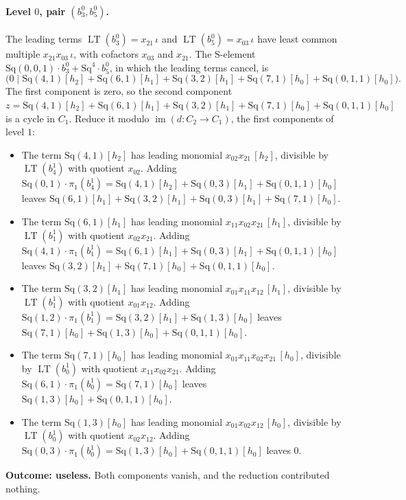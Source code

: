 \documentclass[11pt]{article}
\newcommand{\Sq}{\mathrm{Sq}}
\DeclareMathOperator{\LT}{LT}
\begin{document}
\paragraph{Level $0$, pair $(b^{0}_{3}, b^{0}_{5})$.} The leading terms $\LT(b^{0}_{3}) = x_{21}\,\iota$ and $\LT(b^{0}_{5}) = x_{03}\,\iota$ have least common multiple $x_{21}x_{03}\,\iota$, with cofactors $x_{03}$ and $x_{21}$. The S-element $\Sq(0,0,1)\cdot b^{0}_{3} + \Sq^{4}\cdot b^{0}_{5}$, in which the leading terms cancel, is
\[\bigl(0 \;\big|\; \Sq(4,1)[h_2] + \Sq(6,1)[h_1] + \Sq(3,2)[h_1] + \Sq(7,1)[h_0] + \Sq(0,1,1)[h_0]\bigr).\]
The first component is zero, so the second component $z = \Sq(4,1)[h_2] + \Sq(6,1)[h_1] + \Sq(3,2)[h_1] + \Sq(7,1)[h_0] + \Sq(0,1,1)[h_0]$ is a cycle in $C_{1}$.
Reduce it modulo $\operatorname{im}(d\colon C_{2}\to C_{1})$, the first components of level $1$:
\begin{itemize}
\item The term $\Sq(4,1)[h_2]$ has leading monomial $x_{02}x_{21}\,[h_2]$, divisible by $\LT(b^{1}_{4})$ with quotient $x_{02}$. Adding $\Sq(0,1)\cdot \pi_1(b^{1}_{4}) = \Sq(4,1)[h_2] + \Sq(0,3)[h_1] + \Sq(0,1,1)[h_0]$ leaves $\Sq(6,1)[h_1] + \Sq(3,2)[h_1] + \Sq(0,3)[h_1] + \Sq(7,1)[h_0]$.
\item The term $\Sq(6,1)[h_1]$ has leading monomial $x_{11}x_{02}x_{21}\,[h_1]$, divisible by $\LT(b^{1}_{1})$ with quotient $x_{02}x_{21}$. Adding $\Sq(4,1)\cdot \pi_1(b^{1}_{1}) = \Sq(6,1)[h_1] + \Sq(0,3)[h_1] + \Sq(0,1,1)[h_0]$ leaves $\Sq(3,2)[h_1] + \Sq(7,1)[h_0] + \Sq(0,1,1)[h_0]$.
\item The term $\Sq(3,2)[h_1]$ has leading monomial $x_{01}x_{11}x_{12}\,[h_1]$, divisible by $\LT(b^{1}_{1})$ with quotient $x_{01}x_{12}$. Adding $\Sq(1,2)\cdot \pi_1(b^{1}_{1}) = \Sq(3,2)[h_1] + \Sq(1,3)[h_0]$ leaves $\Sq(7,1)[h_0] + \Sq(1,3)[h_0] + \Sq(0,1,1)[h_0]$.
\item The term $\Sq(7,1)[h_0]$ has leading monomial $x_{01}x_{11}x_{02}x_{21}\,[h_0]$, divisible by $\LT(b^{1}_{0})$ with quotient $x_{11}x_{02}x_{21}$. Adding $\Sq(6,1)\cdot \pi_1(b^{1}_{0}) = \Sq(7,1)[h_0]$ leaves $\Sq(1,3)[h_0] + \Sq(0,1,1)[h_0]$.
\item The term $\Sq(1,3)[h_0]$ has leading monomial $x_{01}x_{02}x_{12}\,[h_0]$, divisible by $\LT(b^{1}_{0})$ with quotient $x_{02}x_{12}$. Adding $\Sq(0,3)\cdot \pi_1(b^{1}_{0}) = \Sq(1,3)[h_0] + \Sq(0,1,1)[h_0]$ leaves $0$.
\end{itemize}
\textbf{Outcome: useless.} Both components vanish, and the reduction contributed nothing.
\medskip
\end{document}
